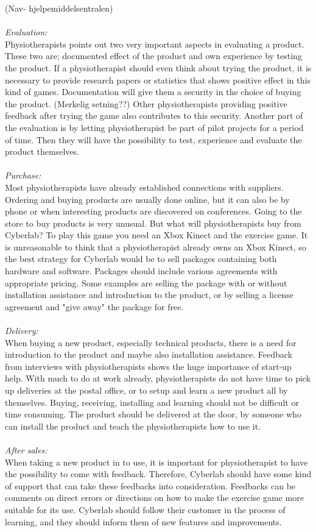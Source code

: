 (Nav- hjelpemiddelsentralen)\\ \\
\emph{Evaluation:}\\
Physiotherapists points out two very important aspects in evaluating a product. These two are; documented effect of the product and own experience by testing the product. If a physiotherapist should even think about trying the product, it is necessary to provide research papers or statistics that shows positive effect in this kind of games. Documentation will give them a security in the choice of buying the product. (Merkelig setning??) Other physiotherapists providing positive feedback after trying the game also contributes to this security. Another part of the evaluation is by letting physiotherapist be part of pilot projects for a period of time. Then they will have the possibility to test, experience and evaluate the product themselves.\\ \\
\emph{Purchase:} \\
Most physiotherapists have already established connections with suppliers. Ordering and buying products are usually done online, but it can also be by phone or when interesting products are discovered on conferences. Going to the store to buy products is very unusual. But what will physiotherapists buy from Cyberlab? To play this game you need an Xbox Kinect and the exercise game. It is unreasonable to think that a physiotherapist already owns an Xbox Kinect, so the best strategy for Cyberlab would be to sell packages containing both hardware and software.  Packages should include various agreements with appropriate pricing. Some examples are selling the package with or without installation assistance and introduction to the product, or by selling a license agreement and "give away" the package for free.\\ \\
\emph{Delivery:}\\
When buying a new product, especially technical products, there is a need for introduction to the product and maybe also installation assistance. Feedback from interviews with physiotherapists shows the huge importance of start-up help. With much to do at work already, physiotherapists do not have time to pick up deliveries at the postal office, or to setup and learn a new product all by themselves. Buying, receiving, installing and learning should not be difficult or time consuming. The product should be delivered at the door, by someone who can install the product and teach the physiotherapists how to use it.\\ \\
\emph{After sales:}\\
When taking a new product in to use, it is important for physiotherapist to have the possibility to come with feedback. Therefore, Cyberlab should have some kind of support that can take these feedbacks into consideration. Feedbacks can be comments on direct errors or directions on how to make the exercise game more suitable for its use. Cyberlab should follow their customer in the process of learning, and they should inform them of new features and improvements.  

